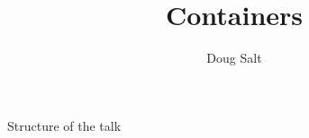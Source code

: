 \documentclass[usenames,dvipsnames,10pt]{beamer}
\title{Containers}
\author{Doug Salt}
\institute{The James Hutton Institute}
\begin{document}
\begin{frame}{Structure of the talk}

\end{frame}
\end{document}
